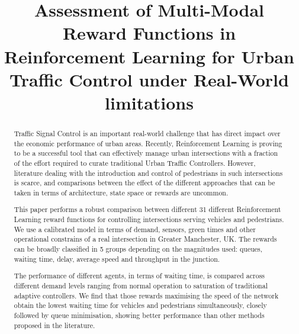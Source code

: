 \documentclass[conference]{IEEEtran}
\begin{document}
\title{Assessment of Multi-Modal Reward Functions in Reinforcement Learning for Urban Traffic Control under Real-World limitations}


\author{
\and
{}
}

\maketitle

\begin{abstract}
Traffic Signal Control is an important real-world challenge that has direct impact over the economic performance of urban areas.
Recently, Reinforcement Learning is proving to be a successful tool that can effectively manage urban intersections with a fraction of the effort required to curate traditional Urban Traffic Controllers. However, literature dealing with the introduction and control of pedestrians in such intersections is scarce, and comparisons between the effect of the different approaches that can be taken in terms of architecture, state space or rewards are uncommon.

This paper performs a robust comparison between different 31 different Reinforcement Learning reward functions for controlling intersections serving vehicles and pedestrians. 
We use a calibrated model in terms of demand, sensors, green times and other operational constrains of a real intersection in Greater Manchester, UK.
The rewards can be broadly classified in 5 groups depending on the magnitudes used: queues, waiting time, delay, average speed and throughput in the junction.
 
The performance of different agents, in terms of waiting time, is compared across different demand levels ranging from normal operation to saturation of traditional adaptive controllers.
We find that those rewards maximising the speed of the network obtain the lowest waiting time for vehicles and pedestrians simultaneously, closely followed by queue minimisation, showing better performance than other methods proposed in the literature.
\end{abstract}
\end{document}
